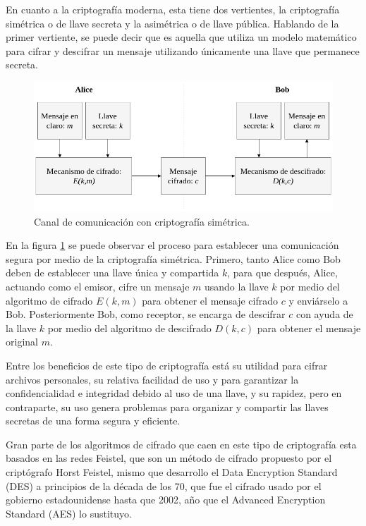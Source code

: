   En cuanto a la criptografía moderna, esta tiene dos vertientes, la
  criptografía simétrica o de llave secreta y la asimétrica o de llave
  pública. Hablando de la primer vertiente, se puede decir que es aquella
  que utiliza un modelo matemático para cifrar y descifrar un mensaje
  utilizando únicamente una llave que permanece secreta.

  \begin{figure}[H]
    \begin{center}
      \includegraphics[width=0.8\linewidth]
        {contenidos/antecedentes/intro/img/cripto_simetrica.png}
      \caption{Canal de comunicación con criptografía simétrica.}
      \label{cripto_simetrica}
    \end{center}
  \end{figure}

  En la figura \ref{cripto_simetrica} se puede observar el proceso para 
  establecer una comunicación segura por medio de la criptografía simétrica. 
  Primero, tanto Alice como Bob deben de establecer una llave única y 
  compartida $k$, para que después, Alice, actuando como el emisor, cifre un 
  mensaje $m$ usando la llave $k$ por medio del algoritmo de cifrado $E(k,m)$ 
  para obtener el mensaje cifrado $c$ y enviárselo a Bob. Posteriormente Bob, 
  como receptor, se encarga de descifrar $c$ con ayuda de la llave $k$ por 
  medio del algoritmo de descifrado $D(k,c)$ para obtener el mensaje original 
  $m$.

  Entre los beneficios de este tipo de criptografía está su utilidad para
  cifrar archivos personales, su relativa facilidad de uso y para garantizar
  la confidencialidad e integridad debido al uso de una llave, y su rapidez,
  pero en contraparte, su uso genera problemas para organizar y compartir
  las llaves secretas de una forma segura y eficiente.

  Gran parte de los algoritmos de cifrado que caen en este tipo de criptografía 
  esta basados en las redes Feistel, que son un método de cifrado propuesto por 
  el criptógrafo Horst Feistel, mismo que desarrollo el Data Encryption Standard 
  (DES) a principios de la década de los 70, que fue el cifrado usado por el 
  gobierno estadounidense hasta que 2002, año que el Advanced Encryption 
  Standard (AES) lo sustituyo. 

